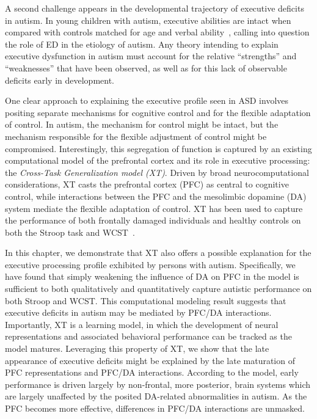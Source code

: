 A second challenge appears in the developmental trajectory of
executive deficits in autism.  In young children with autism,
executive abilities are intact when compared with controls matched for
age and verbal ability~\cite{GriffithEM:1999:AutismYoungED}, calling
into question the role of ED in the etiology of autism.  Any theory
intending to explain executive dysfunction in autism must account for
the relative ``strengths'' and ``weaknesses'' that have been observed,
as well as for this lack of observable deficits early in development.

One clear approach to explaining the executive profile seen in ASD
involves positing separate mechanisms for cognitive control and for
the flexible adaptation of control.  In autism, the mechanism for
control might be intact, but the mechanism responsible for the flexible
adjustment of control might be compromised.  Interestingly, this
segregation of function is captured by an existing computational model
of the prefrontal cortex and its role in executive processing: the
\emph{Cross-Task Generalization model (XT)}.  Driven by broad
neurocomputational considerations, XT casts the prefrontal cortex
(PFC) as central to cognitive control, while interactions between the
PFC and the mesolimbic dopamine (DA) system mediate the flexible
adaptation of control.  XT has been used to capture the performance of
both frontally damaged individuals and healthy controls on both the
Stroop task and WCST~\cite{RougierNP:2005:XT}.

In this chapter, we demonstrate that XT also offers a possible explanation for
the executive processing profile exhibited by persons with autism.
Specifically, we have found that simply weakening the influence of DA
on PFC in the model is sufficient to both qualitatively and
quantitatively capture autistic performance on both Stroop and WCST.
This computational modeling result suggests that executive deficits in
autism may be mediated by PFC/DA interactions.  Importantly, XT is a
learning model, in which the development of neural representations and
associated behavioral performance can be tracked as the model matures.
Leveraging this property of XT, we show that the late appearance of
executive deficits might be explained by the late maturation of PFC
representations and PFC/DA interactions.  According to the model,
early performance is driven largely by non-frontal, more posterior,
brain systems which are largely unaffected by the posited DA-related
abnormalities in autism.  As the PFC becomes more effective,
differences in PFC/DA interactions are unmasked.

